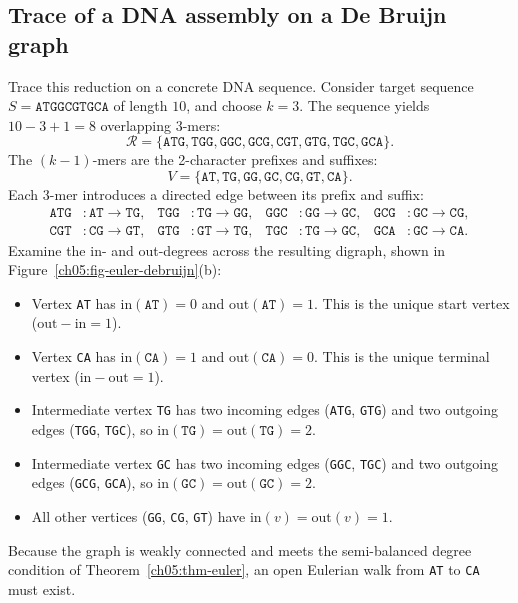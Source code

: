 \subsection{Trace of a DNA assembly on a De Bruijn graph}

Trace this reduction on a concrete DNA sequence. Consider target sequence $S = \texttt{ATGGCGTGCA}$ of length $10$, and choose $k=3$. The sequence yields $10 - 3 + 1 = 8$ overlapping $3$-mers:
\[
\mathcal{R} = \{\texttt{ATG}, \texttt{TGG}, \texttt{GGC}, \texttt{GCG}, \texttt{CGT}, \texttt{GTG}, \texttt{TGC}, \texttt{GCA}\}.
\]
The $(k-1)$-mers are the 2-character prefixes and suffixes:
\[
V = \{\texttt{AT}, \texttt{TG}, \texttt{GG}, \texttt{GC}, \texttt{CG}, \texttt{GT}, \texttt{CA}\}.
\]
Each $3$-mer introduces a directed edge between its prefix and suffix:
\begin{align*}
  \texttt{ATG} &\colon \texttt{AT} \to \texttt{TG}, &
  \texttt{TGG} &\colon \texttt{TG} \to \texttt{GG}, &
  \texttt{GGC} &\colon \texttt{GG} \to \texttt{GC}, &
  \texttt{GCG} &\colon \texttt{GC} \to \texttt{CG}, \\
  \texttt{CGT} &\colon \texttt{CG} \to \texttt{GT}, &
  \texttt{GTG} &\colon \texttt{GT} \to \texttt{TG}, &
  \texttt{TGC} &\colon \texttt{TG} \to \texttt{GC}, &
  \texttt{GCA} &\colon \texttt{GC} \to \texttt{CA}.
\end{align*}
Examine the in- and out-degrees across the resulting digraph, shown in Figure~\ref{ch05:fig-euler-debruijn}(b):
\begin{itemize}
  \item Vertex \texttt{AT} has $\mathrm{in}(\texttt{AT})=0$ and $\mathrm{out}(\texttt{AT})=1$. This is the unique start vertex ($\mathrm{out}-\mathrm{in} = 1$).
  \item Vertex \texttt{CA} has $\mathrm{in}(\texttt{CA})=1$ and $\mathrm{out}(\texttt{CA})=0$. This is the unique terminal vertex ($\mathrm{in}-\mathrm{out} = 1$).
  \item Intermediate vertex \texttt{TG} has two incoming edges (\texttt{ATG}, \texttt{GTG}) and two outgoing edges (\texttt{TGG}, \texttt{TGC}), so $\mathrm{in}(\texttt{TG}) = \mathrm{out}(\texttt{TG}) = 2$.
  \item Intermediate vertex \texttt{GC} has two incoming edges (\texttt{GGC}, \texttt{TGC}) and two outgoing edges (\texttt{GCG}, \texttt{GCA}), so $\mathrm{in}(\texttt{GC}) = \mathrm{out}(\texttt{GC}) = 2$.
  \item All other vertices (\texttt{GG}, \texttt{CG}, \texttt{GT}) have $\mathrm{in}(v) = \mathrm{out}(v) = 1$.
\end{itemize}
Because the graph is weakly connected and meets the semi-balanced degree condition of Theorem~\ref{ch05:thm-euler}, an open Eulerian walk from \texttt{AT} to \texttt{CA} must exist.

